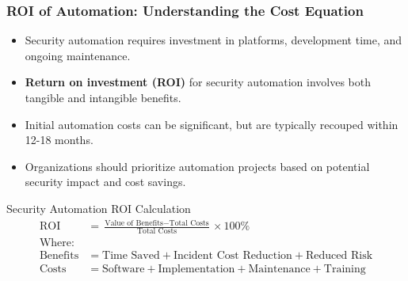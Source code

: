 \documentclass{beamer}
\begin{document}
\begin{frame}
  \frametitle{ROI of Automation: Understanding the Cost Equation}
  
  \begin{itemize}
    \item Security automation requires investment in platforms, development time, and ongoing maintenance.
    \item \textbf{Return on investment (ROI)} for security automation involves both tangible and intangible benefits.
    \item Initial automation costs can be significant, but are typically recouped within 12-18 months.
    \item Organizations should prioritize automation projects based on potential security impact and cost savings.
  \end{itemize}
  
  \begin{exampleblock}{Security Automation ROI Calculation}
    \scriptsize
    \begin{align*}
      \text{ROI} &= \frac{\text{Value of Benefits} - \text{Total Costs}}{\text{Total Costs}} \times 100\% \\
      \text{Where:} \\
      \text{Benefits} &= \text{Time Saved} + \text{Incident Cost Reduction} + \text{Reduced Risk} \\
      \text{Costs} &= \text{Software} + \text{Implementation} + \text{Maintenance} + \text{Training}
    \end{align*}
  \end{exampleblock}
\end{frame}
\end{document}
